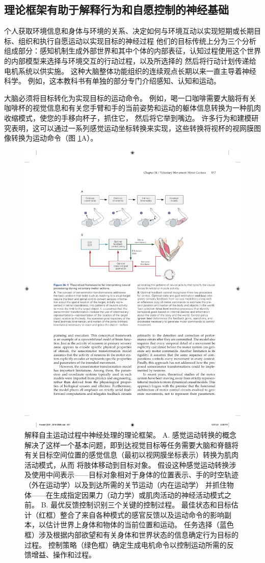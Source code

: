 \subsection{理论框架有助于解释行为和自愿控制的神经基础}
个人获取环境信息和身体与环境的关系、决定如何与环境互动以实现短期或长期目标、组织和执行自愿运动以实现目标的神经过程 他们的目标传统上分为三个分析组成部分：感知机制生成外部世界和其中个体的内部表征，认知过程使用这个世界的内部模型来选择与环境交互的行动过程，以及所选择的 然后将行动计划传递给电机系统以供实施。 这种大脑整体功能组织的连续观点长期以来一直主导着神经科学。 例如，这本教科书有单独的部分专门介绍感知、认知和运动。

大脑必须将目标转化为实现目标的运动命令。 例如，喝一口咖啡需要大脑将有关咖啡杯的视觉信息和有关您手臂和手的当前姿势和运动的躯体信息转换为一种肌肉收缩模式，使您的手移向杯子，抓住它， 然后将它举到嘴边。 
许多行为和建模研究表明，这可以通过一系列感觉运动坐标转换来实现，这些转换将视杯的视网膜图像转换为运动命令（图 \ref{fig:34_1}A）。

\begin{figure}[htbp]
	\centering
	\includegraphics[width=0.75\linewidth]{chap34/fig_34_1}
	\caption{解释自主运动过程中神经处理的理论框架。
		A. 感觉运动转换的概念解决了这样一个基本问题，即到达视觉目标等任务需要大脑和脊髓将有关目标空间位置的感觉信息（最初以视网膜坐标表示）转换为肌肉活动模式，从而 将肢体移动到目标对象。 
		假设这种感觉运动转换涉及使用中间表示——目标对象相对于身体的位置表示、手的时空轨迹（外在运动学）以及到达所需的关节运动（内在运动学） 并抓住物体——在生成指定因果力（动力学）或肌肉活动的神经活动模式之前。 
		B. 最优反馈控制识别三个关键的控制过程。 
		最佳状态和目标估计（红框）整合了来自各种模式的感官反馈以及运动命令的影响副本，以估计世界上身体和物体的当前位置和运动。 
		任务选择（蓝色框）涉及根据内部欲望和有关身体和世界状态的信息确定行为目标的过程。 
		控制策略（绿色框）确定生成电机命令以控制运动所需的反馈增益、操作和过程。}
	\label{fig:34_1}
\end{figure}


